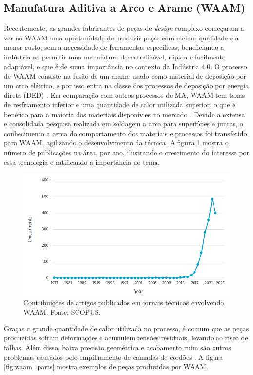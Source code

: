 \subsection{Manufatura Aditiva a Arco e Arame (WAAM)}
Recentemente, as grandes fabricantes de peças de \textit{design} complexo começaram a ver na WAAM uma oportunidade de produzir peças com melhor qualidade e a menor custo, sem a necessidade de ferramentas específicas, beneficiando a indústria ao permitir uma manufatura decentralizável, rápida e facilmente adaptável, o que é de suma importância no contexto da Indústria 4.0. O processo de WAAM consiste na fusão de um arame usado como material de deposição por um arco elétrico, e por isso entra na classe dos processos de deposição por energia direta (DED) \cite{vafadar2021advances}. Em comparação com outros processos de MA, WAAM tem taxas de resfriamento inferior e uma quantidade de calor utilizada superior, o que é benéfico para a maioria dos materiais disponívies no mercado \cite{treutler2021current}. Devido a extensa e consolidada pesquisa realizada em soldagem a arco para superfícies e juntas, o conhecimento a cerca do comportamento dos materiais e processos foi transferido para WAAM, agilizando o desenvolvimento da técnica \cite{oliveira2020revisiting}.A figura \ref{fig:waam_papers} mostra o número de publicações na área, por ano, ilustrando o crescimento do interesse por essa tecnologia e ratificando a importância do tema.
\newpage
\begin{figure}[hbt!]
    \centering
    \includegraphics[width=0.8\linewidth]{Imagens/chap02/waam_papers.png}
    \caption{Contribuições de artigos publicados em jornais técnicos envolvendo WAAM. Fonte: SCOPUS.}
    \label{fig:waam_papers}
\end{figure}

Graças a grande quantidade de calor utilizada no processo, é comum que as peças produzidas sofram deformações e acumulem tensões residuais, levando ao risco de falhas. Além disso, baixa precisão geométrica e acabamento ruim são outros problemas causados pelo empilhamento de camadas de cordões \cite{ding2015wire}. A figura \ref{fig:waam_parts} mostra exemplos de peças produzidas por WAAM.

